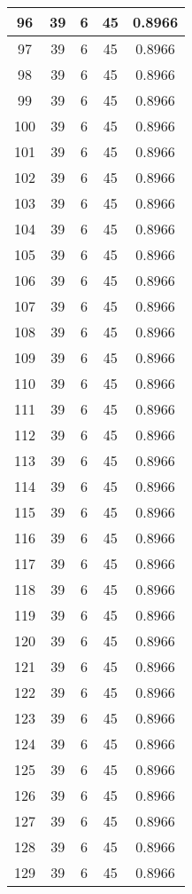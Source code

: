 \documentclass[letterpaper, 12pt]{article}
\begin{document}
\begin{longtable}{|c|c|c|c|c|}
\hline
96 & 39 & 6 & 45 & 0.8966 \\
\hline
97 & 39 & 6 & 45 & 0.8966 \\
\hline
98 & 39 & 6 & 45 & 0.8966 \\
\hline
99 & 39 & 6 & 45 & 0.8966 \\
\hline
100 & 39 & 6 & 45 & 0.8966 \\
\hline
101 & 39 & 6 & 45 & 0.8966 \\
\hline
102 & 39 & 6 & 45 & 0.8966 \\
\hline
103 & 39 & 6 & 45 & 0.8966 \\
\hline
104 & 39 & 6 & 45 & 0.8966 \\
\hline
105 & 39 & 6 & 45 & 0.8966 \\
\hline
106 & 39 & 6 & 45 & 0.8966 \\
\hline
107 & 39 & 6 & 45 & 0.8966 \\
\hline
108 & 39 & 6 & 45 & 0.8966 \\
\hline
109 & 39 & 6 & 45 & 0.8966 \\
\hline
110 & 39 & 6 & 45 & 0.8966 \\
\hline
111 & 39 & 6 & 45 & 0.8966 \\
\hline
112 & 39 & 6 & 45 & 0.8966 \\
\hline
113 & 39 & 6 & 45 & 0.8966 \\
\hline
114 & 39 & 6 & 45 & 0.8966 \\
\hline
115 & 39 & 6 & 45 & 0.8966 \\
\hline
116 & 39 & 6 & 45 & 0.8966 \\
\hline
117 & 39 & 6 & 45 & 0.8966 \\
\hline
118 & 39 & 6 & 45 & 0.8966 \\
\hline
119 & 39 & 6 & 45 & 0.8966 \\
\hline
120 & 39 & 6 & 45 & 0.8966 \\
\hline
121 & 39 & 6 & 45 & 0.8966 \\
\hline
122 & 39 & 6 & 45 & 0.8966 \\
\hline
123 & 39 & 6 & 45 & 0.8966 \\
\hline
124 & 39 & 6 & 45 & 0.8966 \\
\hline
125 & 39 & 6 & 45 & 0.8966 \\
\hline
126 & 39 & 6 & 45 & 0.8966 \\
\hline
127 & 39 & 6 & 45 & 0.8966 \\
\hline
128 & 39 & 6 & 45 & 0.8966 \\
\hline
129 & 39 & 6 & 45 & 0.8966 \\

\end{longtable}
\end{document}
